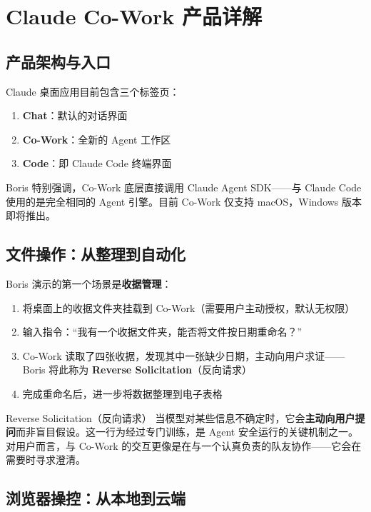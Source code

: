 \section{Claude Co-Work 产品详解}

\subsection{产品架构与入口}

Claude 桌面应用目前包含三个标签页：

\begin{enumerate}
    \item \textbf{Chat}：默认的对话界面
    \item \textbf{Co-Work}：全新的 Agent 工作区
    \item \textbf{Code}：即 Claude Code 终端界面
\end{enumerate}

Boris 特别强调，Co-Work 底层直接调用 Claude Agent SDK——与 Claude Code 使用的是完全相同的 Agent 引擎。目前 Co-Work 仅支持 macOS，Windows 版本即将推出。

\subsection{文件操作：从整理到自动化}

Boris 演示的第一个场景是\textbf{收据管理}：

\begin{enumerate}
    \item 将桌面上的收据文件夹挂载到 Co-Work（需要用户主动授权，默认无权限）
    \item 输入指令：``我有一个收据文件夹，能否将文件按日期重命名？''
    \item Co-Work 读取了四张收据，发现其中一张缺少日期，主动向用户求证——Boris 将此称为 \textbf{Reverse Solicitation}（反向请求）
    \item 完成重命名后，进一步将数据整理到电子表格
\end{enumerate}

\begin{importantbox}{Reverse Solicitation（反向请求）}
当模型对某些信息不确定时，它会\textbf{主动向用户提问}而非盲目假设。这一行为经过专门训练，是 Agent 安全运行的关键机制之一。对用户而言，与 Co-Work 的交互更像是在与一个认真负责的队友协作——它会在需要时寻求澄清。
\end{importantbox}

\subsection{浏览器操控：从本地到云端}

